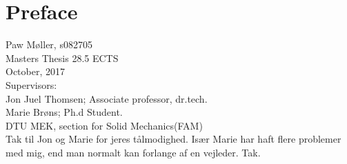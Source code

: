 
\section*{Preface}

{\parindent0pt
Paw Møller, s082705\\
Masters Thesis 28.5 ECTS\\
October, 2017\\
Supervisors:\\
Jon Juel Thomsen; Associate professor, dr.tech.\\
Marie Brøns; Ph.d Student.\\
DTU MEK, section for Solid Mechanics(FAM)\\

Tak til Jon og Marie for jeres tålmodighed. Især Marie har haft flere problemer
med mig, end man normalt kan forlange af en vejleder. Tak.
}
